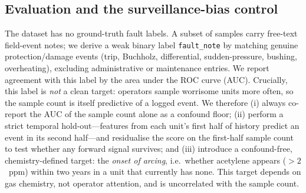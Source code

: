 \subsection{Evaluation and the surveillance-bias control}
\label{ssec:eval}
The dataset has no ground-truth fault labels. A subset of samples carry free-text field-event
notes; we derive a weak binary label \texttt{fault\_note} by matching genuine
protection/damage events (trip, Buchholz, differential, sudden-pressure, bushing,
overheating), excluding administrative or maintenance entries. We report agreement with this
label by the area under the ROC curve (AUC). Crucially, this label is \emph{not} a clean
target: operators sample worrisome units more often, so the sample count is itself predictive
of a logged event. We therefore (i) always co-report the AUC of the sample count alone as a
confound floor; (ii) perform a strict temporal hold-out---features from each unit's first half
of history predict an event in its second half---and residualise the score on the first-half
sample count to test whether any forward signal survives; and (iii) introduce a confound-free,
chemistry-defined target: the \emph{onset of arcing}, i.e.\ whether acetylene appears
($>2$~ppm) within two years in a unit that currently has none. This target depends on gas
chemistry, not operator attention, and is uncorrelated with the sample count.
